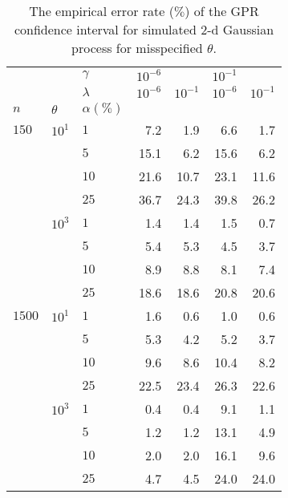\documentclass[a4paper,14pt]{extarticle}
\begin{document}
\begin{table}
  \centering
  \caption{The empirical error rate ($\%$) of the GPR confidence interval for simulated
  $2$-d Gaussian process for misspecified $\theta$.}
  \label{tab:gaussian_2d_cov_gpr_neq}
  \begin{tabular}{lll||rr|rr}
  \toprule
       &      & $\gamma$ & $10^{-6}$ &          & $10^{-1}$ &          \\\cline{3-3}
       &      & $\lambda$ & $10^{-6}$ & $10^{-1}$ & $10^{-6}$ & $10^{-1}$ \\\cline{3-3}
  $n$ & $\theta$ & $\alpha(\%)$ &          &          &          &          \\
  \midrule
  $150$  & $10^1$ & $1$ &      7.2 &      1.9 &      6.6 &      1.7 \\
       &      & $5$ &     15.1 &      6.2 &     15.6 &      6.2 \\
       &      & $10$ &     21.6 &     10.7 &     23.1 &     11.6 \\
       &      & $25$ &     36.7 &     24.3 &     39.8 &     26.2 \\\cline{2-7}
       & $10^3$ & $1$ &      1.4 &      1.4 &      1.5 &      0.7 \\
       &      & $5$ &      5.4 &      5.3 &      4.5 &      3.7 \\
       &      & $10$ &      8.9 &      8.8 &      8.1 &      7.4 \\
       &      & $25$ &     18.6 &     18.6 &     20.8 &     20.6 \\
  \midrule
  $1500$ & $10^1$ & $1$ &      1.6 &      0.6 &      1.0 &      0.6 \\
       &      & $5$ &      5.3 &      4.2 &      5.2 &      3.7 \\
       &      & $10$ &      9.6 &      8.6 &     10.4 &      8.2 \\
       &      & $25$ &     22.5 &     23.4 &     26.3 &     22.6 \\\cline{2-7}
       & $10^3$ & $1$ &      0.4 &      0.4 &      9.1 &      1.1 \\
       &      & $5$ &      1.2 &      1.2 &     13.1 &      4.9 \\
       &      & $10$ &      2.0 &      2.0 &     16.1 &      9.6 \\
       &      & $25$ &      4.7 &      4.5 &     24.0 &     24.0 \\
  \bottomrule
  \end{tabular}
\end{table}
\end{document}
